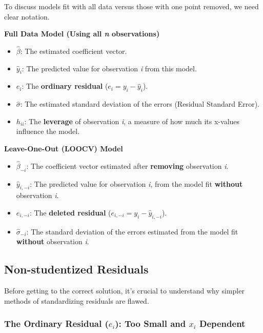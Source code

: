 \documentclass[
  letterpaper,
  DIV=11,
  numbers=noendperiod]{scrreprt}
\providecommand{\tightlist}{%
  \setlength{\itemsep}{0pt}\setlength{\parskip}{0pt}}\usepackage{longtable,booktabs,array}
\begin{document}
To discuss models fit with all data versus those with one point removed,
we need clear notation.

\textbf{Full Data Model (Using all \emph{n} observations)}

\begin{itemize}
\tightlist
\item
  \(\hat{\beta}\): The estimated coefficient vector.
\item
  \(\hat{y}_i\): The predicted value for observation \emph{i} from this
  model.
\item
  \(e_i\): The \textbf{ordinary residual} (\(e_i = y_i - \hat{y}_i\)).
\item
  \(\hat{\sigma}\): The estimated standard deviation of the errors
  (Residual Standard Error).
\item
  \(h_{ii}\): The \textbf{leverage} of observation \emph{i}, a measure
  of how much its x-values influence the model.
\end{itemize}

\textbf{Leave-One-Out (LOOCV) Model}

\begin{itemize}
\tightlist
\item
  \(\hat{\beta}_{-i}\): The coefficient vector estimated after
  \textbf{removing} observation \emph{i}.
\item
  \(\hat{y}_{i,-i}\): The predicted value for observation \emph{i}, from
  the model fit \textbf{without} observation \emph{i}.
\item
  \(e_{i,-i}\): The \textbf{deleted residual}
  (\(e_{i,-i} = y_i - \hat{y}_{i,-i}\)).
\item
  \(\hat{\sigma}_{-i}\): The standard deviation of the errors estimated
  from the model fit \textbf{without} observation \emph{i}.
\end{itemize}

\subsection{Non-studentized Residuals}\label{non-studentized-residuals}

Before getting to the correct solution, it's crucial to understand why
simpler methods of standardizing residuals are flawed.

\subsubsection{\texorpdfstring{\textbf{The Ordinary Residual (}\(e_i\)):
Too Small and \(x_i\)
Dependent}{The Ordinary Residual (e\_i): Too Small and x\_i Dependent}}\label{the-ordinary-residual-e_i-too-small-and-x_i-dependent}
\end{document}
